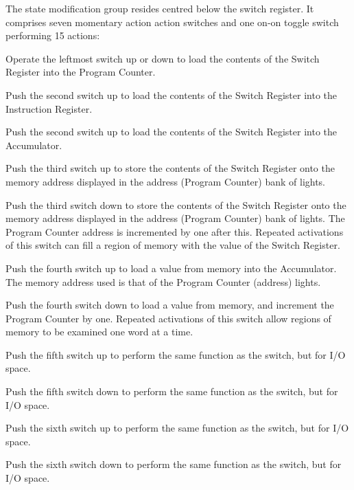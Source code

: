 The state modification group resides centred below the switch
register. It comprises seven momentary action action switches and one
on-on toggle switch performing 15 actions:

\begin{description}
\item{\bfseries{}} Operate the leftmost switch up or down to load the
  contents of the Switch Register into the Program Counter.
\item{\bfseries{}} Push the second switch up to load the contents
  of the Switch Register into the Instruction Register.
\item{\bfseries{}} Push the second switch up to load the contents
  of the Switch Register into the \gls{Accumulator}.
\item{\bfseries{}} Push the third switch up to store the
  contents of the Switch Register onto the memory address displayed in
  the address (Program Counter) bank of lights.
\item{\bfseries{}} Push the third switch down to store the
  contents of the Switch Register onto the memory address displayed in
  the address (Program Counter) bank of lights. The Program Counter
  address is incremented by one after this. Repeated activations of
  this switch can fill a region of memory with the value of the Switch
  Register.
\item{\bfseries{}} Push the fourth switch up to load a
  value from memory into the \gls{Accumulator}. The memory address used is
  that of the Program Counter (address) lights.
\item{\bfseries{}} Push the fourth switch down to load a
  value from memory, and increment the Program Counter by
  one. Repeated activations of this switch allow regions of memory to
  be examined one word at a time.
\item{\bfseries{}} Push the fifth switch up to
  perform the same function as the  switch, but for
  I/O space.
\item{\bfseries{}} Push the fifth switch down to
  perform the same function as the  switch, but
  for I/O space.
\item{\bfseries{}} Push the sixth switch up to
  perform the same function as the  switch, but for
  I/O space.
\item{\bfseries{}} Push the sixth switch down to
  perform the same function as the  switch, but
  for I/O space.


\end{description}
